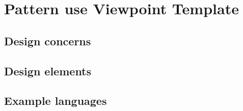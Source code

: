 \chapter{Pattern use Viewpoint Template} \label{chp:pattern-use-viewpoint-template}
	\begin{comment}
		This viewpoint addresses design ideas (emergent concepts) as collaboration patterns involving abstracted
		roles and connectors.
	\end{comment}
	
	\section{Design concerns} \label{s:pattern-use-viewpoint-template:design-concerns}
		\begin{comment}
			Key concerns include reuse at the level of design ideas (design patterns), architectural styles, and
			framework templates.
		\end{comment}
	
	\section{Design elements} \label{s:pattern-use-viewpoint-template:design-elements}
		\begin{comment}
			Design entities: collaboration, class, connector, role, framework template, and pattern.
			
			Design relationships: association, collaboration use, and connector.
			
			Design attributes: name.
			
			Design constraints: collaboration constraints.
		\end{comment}
	
	\section{Example languages} \label{s:pattern-use-viewpoint-template:example-languages}
		\begin{comment}
			UML composite structure diagram and a combination of the UML class diagram and the UML package
			diagram (OMG [B28]).
		\end{comment}